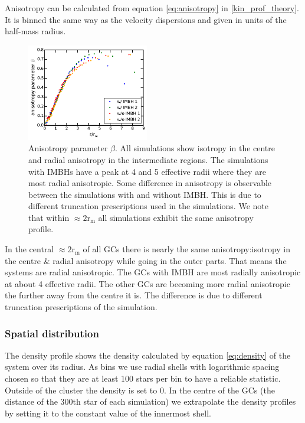 \par Anisotropy can be calculated from equation \eqref{eq:anisotropy} in \ref{kin_prof_theory}. It is binned the same way as the velocity dispersions and given in units of the half-mass radius.
\begin{figure}[htbp]
	\centering
	\includegraphics[width=0.475\textwidth]{Plots/anisotropy_parameter_beta.pdf}
	\caption{Anisotropy parameter \(\beta\). All simulations show isotropy in the centre and radial anisotropy in the intermediate regions. The simulations with \acp{IMBH} have a peak at 4 and 5 effective radii where they are most radial anisotropic. Some difference in anisotropy is observable between the simulations with and without \ac{IMBH}. This is due to different truncation prescriptions used in the simulations. We note that within \(\approx 2\mathrm{r_m}\) all simulations exhibit the same anisotropy profile.}
	\label{fig:anisotropy_param}
\end{figure}
In the central \(\approx 2\mathrm{r_m}\) of all \acp{GC} there is nearly the same anisotropy:isotropy in the centre \& radial anisotropy while going in the outer parts. That means the systems are radial anisotropic. The \acp{GC} with \ac{IMBH} are most radially anisotropic at about 4 effective radii. The other \acp{GC} are becoming more radial anisotropic the further away from the centre it is. The difference is due to different truncation prescriptions of the simulation.

\subsubsection{Spatial distribution}
The density profile shows the density calculated by equation \eqref{eq:density} of the system over its radius. As bins we use radial shells with logarithmic spacing chosen so that they are at least 100 stars per bin to have a reliable statistic. Outside of the cluster the density is set to 0. In the centre of the \acp{GC} (the distance of the 300th star of each simulation) we extrapolate the density profiles by setting it to the constant value of the innermost shell. 

